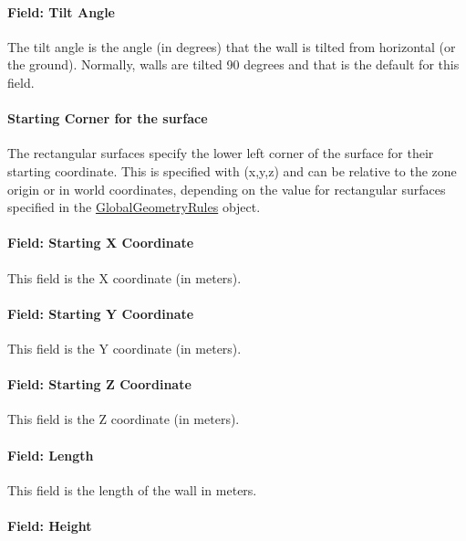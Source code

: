 \paragraph{Field: Tilt Angle}\label{field-tilt-angle-3}

The tilt angle is the angle (in degrees) that the wall is tilted from horizontal (or the ground). Normally, walls are tilted 90 degrees and that is the default for this field.

\paragraph{Starting Corner for the surface}\label{starting-corner-for-the-surface-3}

The rectangular surfaces specify the lower left corner of the surface for their starting coordinate. This is specified with (x,y,z) and can be relative to the zone origin or in world coordinates, depending on the value for rectangular surfaces specified in the \hyperref[globalgeometryrules]{GlobalGeometryRules} object.

\paragraph{Field: Starting X Coordinate}\label{field-starting-x-coordinate-3}

This field is the X coordinate (in meters).

\paragraph{Field: Starting Y Coordinate}\label{field-starting-y-coordinate-3}

This field is the Y coordinate (in meters).

\paragraph{Field: Starting Z Coordinate}\label{field-starting-z-coordinate-3}

This field is the Z coordinate (in meters).

\paragraph{Field: Length}\label{field-length-3}

This field is the length of the wall in meters.

\paragraph{Field: Height}\label{field-height-3}

